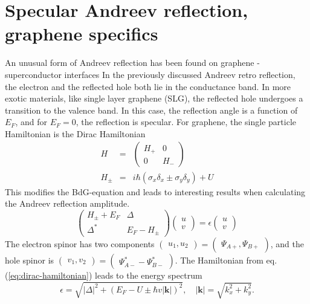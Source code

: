 \section{Specular Andreev reflection, graphene specifics}
An unusual form of Andreev reflection has been found on graphene - superconductor interfaces %
In the previously discussed Andreev retro reflection, the electron and the reflected hole both lie in the conductance band. In more exotic materials, like  single layer graphene (SLG), the reflected hole undergoes a transition to the valence band. In this case, the reflection angle is a function of $E_F$, and for $E_F = 0$, the reflection is specular.
For graphene, the single particle Hamiltonian is the Dirac Hamiltonian
\begin{eqnarray}
H &=& \begin{pmatrix}
H_+ & 0 \\
0 & H_- 
\end{pmatrix} \\
H_\pm &=& i \hbar \left( \sigma_x \delta_x \pm \sigma_y \delta_y \right) + U
\end{eqnarray}
This modifies the BdG-equation and leads to interesting results when calculating the Andreev reflection amplitude. 
\begin{equation}
\begin{pmatrix}
H_\pm + E_F & \Delta \\
\Delta^* & E_F - H_\pm 
\end{pmatrix} \begin{pmatrix}
u \\ v \end{pmatrix} = \epsilon \begin{pmatrix} u \\v \end{pmatrix} \label{eq:dirac-hamiltonian}
\end{equation}
The electron spinor has two components $\begin{pmatrix} u_1, u_2\end{pmatrix} = \begin{pmatrix} \Psi_{A+}, \Psi_{B+} \end{pmatrix}$, and the hole spinor is $\begin{pmatrix} v_1, v_2\end{pmatrix} = \begin{pmatrix} \Psi^{*}_{A-} - \Psi^{*}_{B-} \end{pmatrix}$.
The Hamiltonian from eq. (\ref{eq:dirac-hamiltonian}) leads to the energy spectrum
\begin{equation}
\epsilon = \sqrt{|\Delta|^2 + \left( E_F - U \pm \hbar v |\mathbf{k}|\right) ^2}, \quad |\mathbf{k}| = \sqrt{k_x^2 + k_y^2}.
\end{equation}
